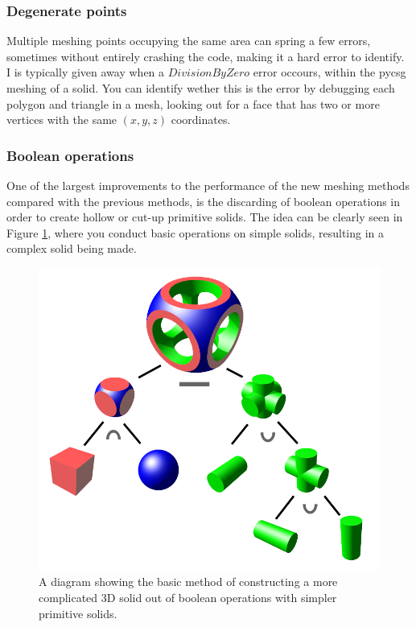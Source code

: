 \documentclass[12pt,a4paper]{article}
\begin{document}
\subsubsection{Degenerate points}
Multiple meshing points occupying the same area can spring a few errors, sometimes without entirely crashing the code, making it a hard error to identify. I is typically given away when a $DivisionByZero$ error occours, within the pycsg meshing of a solid. You can identify wether this is the error by debugging each polygon and triangle in a mesh, looking out for a face that has two or more vertices with the same $(x,y,z)$ coordinates.

\subsubsection{Boolean operations}
\label{bool}
One of the largest improvements to the performance of the new meshing methods compared with the previous methods, is the discarding of boolean operations in order to create hollow or cut-up primitive solids. The idea can be clearly seen in Figure \ref{booly}, where you conduct basic operations on simple solids, resulting in a complex solid being made.
\\
\begin{figure}[h!]
\centering
\includegraphics[scale=0.3]{Images//Booleans//Boolean.png}
\caption[width=\columnwidth]{A diagram showing the basic method of constructing a more complicated 3D solid out of boolean operations with simpler primitive solids.}
\label{booly}
\end{figure}
\end{document}
